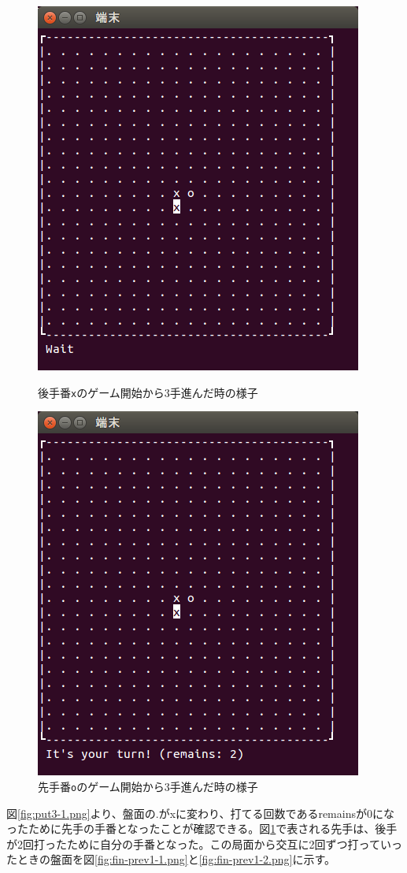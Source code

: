 \documentclass[a4j, titlepage, 10pt]{jsarticle}
\newcommand{\code}[1]{\texttt{#1}}
\begin{document}
\begin{figure}[H]
  \begin{minipage}{0.5\hsize}
    \centering
    \includegraphics[scale=0.5]{img/put3-1.png}
    \caption{後手番\code{x}のゲーム開始から3手進んだ時の様子}
    \label{fig:put3-1.png}
  \end{minipage}
  \begin{minipage}{0.5\hsize}
    \includegraphics[scale=0.5]{img/put3-2.png}
    \caption{先手番\code{o}のゲーム開始から3手進んだ時の様子}
    \label{fig:put3-2.png}
  \end{minipage}
\end{figure}
図\ref{fig:put3-1.png}より、盤面の{\ttfamily .}が{\ttfamily x}に変わり、打てる回数である{\ttfamily remains}が0になったために先手の手番となったことが確認できる。図\ref{fig:put3-2.png}で表される先手は、後手が2回打ったために自分の手番となった。この局面から交互に2回ずつ打っていったときの盤面を図\ref{fig:fin-prev1-1.png}と\ref{fig:fin-prev1-2.png}に示す。
\end{document}
